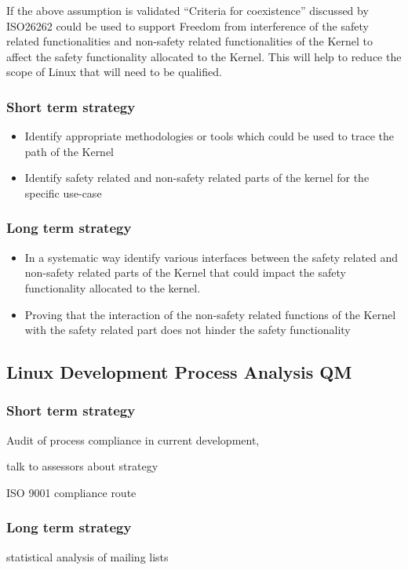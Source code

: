 \documentclass[12pt]{ElisaPaper}
\begin{document}
If the above assumption is validated “Criteria for coexistence” discussed by ISO26262 could be used to support Freedom from interference of the safety related functionalities and non-safety related functionalities of the Kernel to affect the safety functionality allocated to the Kernel. This will help to reduce the scope of Linux that will need to be qualified.

\subsubsection{Short term strategy}
\begin{itemize}
	\item	Identify appropriate methodologies or tools which could be used to trace the path of the Kernel 
	\item	Identify safety related and non-safety related parts of the kernel for the specific use-case
\end{itemize}
\subsubsection{Long term strategy}
\begin{itemize}
\item	In a systematic way identify various interfaces between the safety related and non-safety related parts of the Kernel that could impact the safety functionality allocated to the kernel.
\item	Proving that the interaction of the non-safety related functions of the Kernel with the safety related part does not hinder the safety functionality
\end{itemize}

\subsection{Linux Development Process Analysis QM}

\subsubsection{Short term strategy}
Audit of process compliance in current development, 

talk to assessors about strategy

ISO 9001 compliance route

\subsubsection{Long term strategy}
statistical analysis of mailing lists
\end{document}
